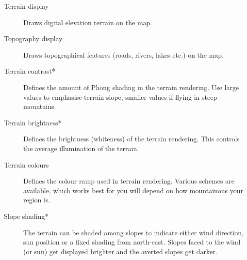 \begin{description}
\item[Terrain display]  Draws digital elevation terrain on the map.
\item[Topography display]  Draws topographical features (roads, rivers, lakes etc.) on
 the map.
\item[Terrain contrast*]  Defines the amount of Phong shading in the terrain rendering. 
 Use large values to emphasise terrain slope, smaller values if flying in steep mountains.
\item[Terrain brightness*]  Defines the brightness (whiteness) of the terrain rendering. 
 This controls the average illumination of the terrain.
\item[Terrain colours]  Defines the colour ramp used in terrain rendering.  Various 
 schemes are available, which works best for you will depend on how mountainous your region is.
\item[Slope shading*]  \label{conf:shading} The terrain can be shaded among slopes 
 to indicate either wind direction, sun position or a fixed shading from north-east. 
 Slopes faced to the wind (or sun) get displayed brighter and the averted slopes get darker.
\end{description}


